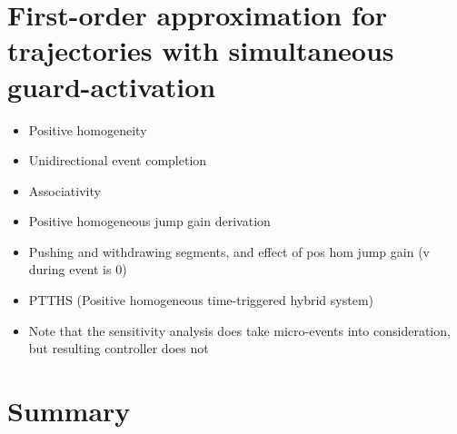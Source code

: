 \documentclass[../DC2017114Bouma.tex]{subfiles}
\begin{document}
\section{First-order approximation for trajectories with simultaneous guard-activation}
\begin{itemize}
\item Positive homogeneity
\item Unidirectional event completion
\item Associativity
\item Positive homogeneous jump gain derivation
\item Pushing and withdrawing segments, and effect of pos hom jump gain (v during event is 0)
\item PTTHS (Positive homogeneous time-triggered hybrid system)
\item Note that the sensitivity analysis does take micro-events into consideration, but resulting controller does not
\end{itemize}
%
%
%
%
%
%

\section{Summary}
\end{document}
